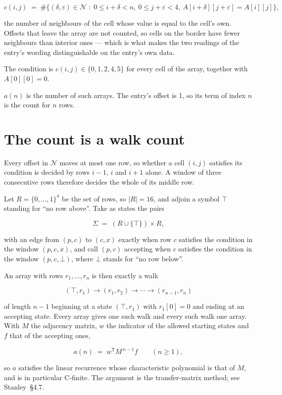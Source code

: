 \documentclass[11pt]{article}
\theoremstyle{definition}
\begin{document}
\[c(i,j) \;=\; \#\bigl\{(\delta,\varepsilon)\in\mathcal{N} \;:\; 0\le i+\delta<n,\ 0\le j+\varepsilon<4,\ A[i+\delta][j+\varepsilon] = A[i][j]\bigr\},\]

the number of neighbours of the cell whose value is equal to the cell's own. Offsets that leave the array are not counted, so cells on the border have fewer neighbours than interior ones --- which is what makes the two readings of the entry's wording distinguishable on the entry's own data.

The condition is $c(i,j) \in \{0, 1, 2, 4, 5\}$ for every cell of the array, together with $A[0][0]=0$.

$a(n)$ is the number of such arrays. The entry's offset is 1, so its term of index $n$ is the count for $n$ rows.

\section{The count is a walk count}

Every offset in $\mathcal{N}$ moves at most one row, so whether a cell $(i,j)$ satisfies its condition is decided by rows $i-1$, $i$ and $i+1$ alone. A window of three consecutive rows therefore decides the whole of its middle row.

Let $R = \{0,\dots,1\}^{4}$ be the set of rows, so $|R| = 16$, and adjoin a symbol $\top$ standing for ``no row above''. Take as states the pairs

\[\Sigma \;=\; (R \cup \{\top\}) \times R,\]

with an edge from $(p,c)$ to $(c,x)$ exactly when row $c$ satisfies the condition in the window $(p,c,x)$, and call $(p,c)$ accepting when $c$ satisfies the condition in the window $(p,c,\bot)$, where $\bot$ stands for ``no row below''.

An array with rows $r_1,\dots,r_n$ is then exactly a walk

\[(\top,r_1) \to (r_1,r_2) \to \cdots \to (r_{n-1},r_n)\]

of length $n-1$ beginning at a state $(\top,r_1)$ with $r_1[0]=0$ and ending at an accepting state. Every array gives one such walk and every such walk one array. With $M$ the adjacency matrix, $w$ the indicator of the allowed starting states and $f$ that of the accepting ones,

\[a(n) \;=\; w^{\mathsf T} M^{\,n-1} f \qquad (n \ge 1),\]

so $a$ satisfies the linear recurrence whose characteristic polynomial is that of $M$, and is in particular C-finite. The argument is the transfer-matrix method; see Stanley~\S4.7.
\end{document}
